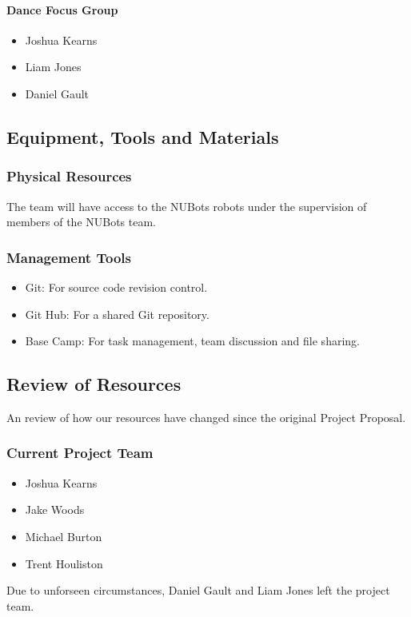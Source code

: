 \documentclass[a4paper]{article}
\begin{document}
				\paragraph{Dance Focus Group}
					\begin{itemize}
						\item Joshua Kearns
						\item Liam Jones
						\item Daniel Gault
					\end{itemize}
		\subsection{Equipment, Tools and Materials}
			\subsubsection{Physical Resources}
			The team will have access to the NUBots robots under the supervision of members of the NUBots team.
			\subsubsection{Management Tools}
				\begin{itemize}
					\item Git: For source code revision control.
					\item Git Hub: For a shared Git repository.
					\item Base Camp: For task management, team discussion and file sharing.
				\end{itemize}
		\subsection {Review of Resources}
			An review of how our resources have changed since the original Project Proposal.
			\subsubsection{Current Project Team}
				\begin{itemize}
					\item Joshua Kearns
					\item Jake Woods
					\item Michael Burton
					\item Trent Houliston
				\end{itemize}
				Due to unforseen circumstances, Daniel Gault and Liam Jones left the project team.
\end{document}
